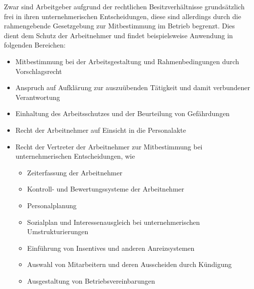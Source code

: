 Zwar sind Arbeitgeber aufgrund der rechtlichen Besitzverhältnisse grundsätzlich frei in ihren unternehmerischen Entscheidungen, diese sind allerdings durch die rahmengebende Gesetzgebung zur Mitbestimmung im Betrieb begrenzt. Dies dient dem Schutz der Arbeitnehmer und findet beispielsweise Anwendung in folgenden Bereichen: 
\newline
\begin{itemize}
	\item Mitbestimmung bei der Arbeitsgestaltung und Rahmenbedingungen durch Vorschlagsrecht
	\item Anspruch auf Aufklärung zur auszuübenden Tätigkeit und damit verbundener Verantwortung
	\item Einhaltung des Arbeitsschutzes und der Beurteilung von Gefährdungen
	\item Recht der Arbeitnehmer auf Einsicht in die Personalakte
	\item Recht der Vertreter der Arbeitnehmer zur Mitbestimmung bei unternehmerischen Entscheidungen, wie
	\begin{itemize}
		\item Zeiterfassung der Arbeitnehmer
		\item Kontroll- und Bewertungssysteme der Arbeitnehmer
		\item Personalplanung
		\item Sozialplan und Interessenausgleich bei unternehmerischen Umstrukturierungen
		\item Einführung von Insentives und anderen Anreizsystemen
		\item Auswahl von Mitarbeitern und deren Ausscheiden durch Kündigung
		\item Ausgestaltung von Betriebsvereinbarungen
	\end{itemize}
\end{itemize}